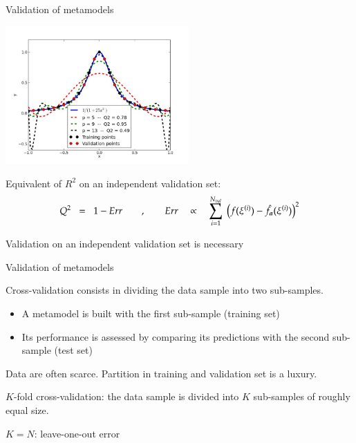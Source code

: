 \documentclass[9pt]{beamer}
\begin{document}
\begin{frame}[t]{Validation of metamodels}

\begin{center}
 \includegraphics[width=7cm]{../Pics/runge-func-ols-with-q2.jpeg} \\
\end{center}

Equivalent of $R^2$ on an independent validation set:
$$  Q^2 \; \; = \; \; 1 - Err \qquad , \qquad Err \quad \propto \quad \sum_{i=1}^{N_{val}} \; \left( f(\xi^{(i)}) - \hat{f}_{\boldsymbol a}(\xi^{(i)})  \right)^2  $$

\begin{center}
	Validation on an independent validation set is necessary
\end{center}

\end{frame}

\begin{frame}[t]{Validation of metamodels}

Cross-validation consists in dividing the data sample into two sub-samples. 
\begin{itemize}
	\item A metamodel is built with the first sub-sample (training set)
	\item Its performance is assessed by comparing its predictions with the second sub-sample (test set)
\end{itemize}

Data are often scarce. Partition in training and validation set is a luxury.

\vfill

$K$-fold cross-validation: the data sample is divided into $K$ sub-samples of roughly equal size.

$K= N$: leave-one-out error



\end{frame}
\end{document}
